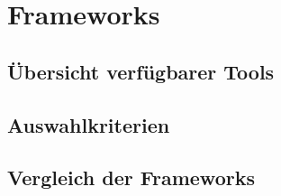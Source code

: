 \chapter{Frameworks}\label{ch:frameworks}

\section{Übersicht verfügbarer Tools}\label{sec:frameworks_overview}

\section{Auswahlkriterien}\label{sec:frameworks_selection}

\section{Vergleich der Frameworks}\label{sec:frameworks_comparison}
